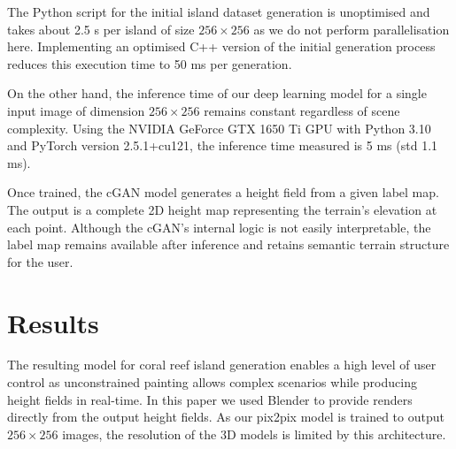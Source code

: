 The Python script for the initial island dataset generation is unoptimised and takes about 2.5 s per island of size $256 \times 256$ as we do not perform parallelisation here. Implementing an optimised C++ version of the initial generation process reduces this execution time to 50 ms per generation.

On the other hand, the inference time of our deep learning model for a single input image of dimension $256 \times 256$ remains constant regardless of scene complexity. Using the NVIDIA GeForce GTX 1650 Ti GPU with Python 3.10 and PyTorch version 2.5.1+cu121, the inference time measured is 5 ms (std 1.1 ms).

Once trained, the cGAN model generates a height field from a given label map. The output is a complete 2D height map representing the terrain's elevation at each point. Although the cGAN's internal logic is not easily interpretable, the label map remains available after inference and retains semantic terrain structure for the user.



\section{Results}
\label{sec:coral-island-results}

The resulting model for coral reef island generation enables a high level of user control as unconstrained painting allows complex scenarios while producing height fields in real-time. In this paper we used Blender to provide renders directly from the output height fields. As our pix2pix model is trained to output $256\times256$ images, the resolution of the 3D models is limited by this architecture.

